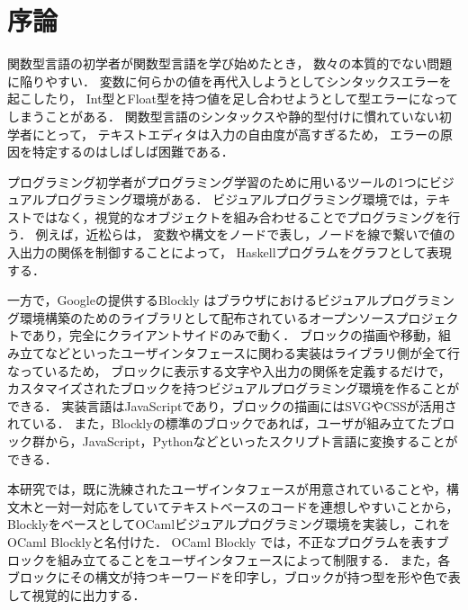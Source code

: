 \chapter{序論}\label{chap:intro}

関数型言語の初学者が関数型言語を学び始めたとき，
数々の本質的でない問題に陥りやすい．
変数に何らかの値を再代入しようとしてシンタックスエラーを起こしたり，
Int型とFloat型を持つ値を足し合わせようとして型エラーになってしまうことがある．
関数型言語のシンタックスや静的型付けに慣れていない初学者にとって，
テキストエディタは入力の自由度が高すぎるため，
エラーの原因を特定するのはしばしば困難である．

プログラミング初学者がプログラミング学習のために用いるツールの1つにビジュアルプログラミング環境がある\cite{Viscuit,Scratch,Snap}．
ビジュアルプログラミング環境では，テキストではなく，視覚的なオブジェクトを組み合わせることでプログラミングを行う．
例えば，近松ら\cite{HaskellVP}は，
変数や構文をノードで表し，ノードを線で繋いで値の入出力の関係を制御することによって，
Haskellプログラムをグラフとして表現する．

一方で，Googleの提供するBlockly \cite{Blockly}はブラウザにおけるビジュアルプログラミング環境構築のためのライブラリとして配布されているオープンソースプロジェクトであり，完全にクライアントサイドのみで動く．
ブロックの描画や移動，組み立てなどといったユーザインタフェースに関わる実装はライブラリ側が全て行なっているため，
ブロックに表示する文字や入出力の関係を定義するだけで，カスタマイズされたブロックを持つビジュアルプログラミング環境を作ることができる．
実装言語はJavaScriptであり，ブロックの描画にはSVGやCSSが活用されている．
また，Blocklyの標準のブロックであれば，ユーザが組み立てたブロック群から，JavaScript，Pythonなどといったスクリプト言語に変換することができる．

本研究では，既に洗練されたユーザインタフェースが用意されていることや，構文木と一対一対応をしていてテキストベースのコードを連想しやすいことから，
BlocklyをベースとしてOCamlビジュアルプログラミング環境を実装し，これをOCaml Blocklyと名付けた．
OCaml Blockly では，不正なプログラムを表すブロックを組み立てることをユーザインタフェースによって制限する．
また，各ブロックにその構文が持つキーワードを印字し，ブロックが持つ型を形や色で表して視覚的に出力する．

